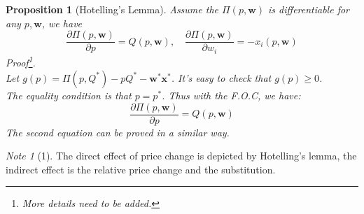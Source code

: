 \documentclass{book}
\theoremstyle{plain}
\newtheorem{prop}[thm]{Proposition}
\theoremstyle{definition}
\theoremstyle{remark}
\newtheorem*{note}{Note}
\begin{document}
\begin{prop}[Hotelling's Lemma]
Assume the $\Pi(p,\bm{w})$ is differentiable for any $p,\bm{w}$, we have
\begin{equation}
\frac{\partial \Pi(p,\bm{w})}{\partial p} = Q(p,\bm{w}),  \quad \frac{\partial \Pi(p,\bm{w})}{\partial w_i} = - x_i(p,\bm{w})
\end{equation}
Proof\footnote{More details need to be added.}.\\
Let $g(p) = \Pi(p,Q^{*}) - pQ^{*} - \bm{w^{*}}\bm{x^{*}}$. It's easy to check that $g(p)\geq 0$.\\
The equality condition is that $p=p^{*}$. Thus with the F.O.C, we have:
\begin{equation}
\frac{\partial \Pi(p,\bm{w})}{\partial p} = Q(p,\bm{w})
\end{equation}
The second equation can be proved in a similar way.
\end{prop}
\begin{note}[1]
The direct effect of price change is depicted by Hotelling's lemma, the indirect effect is the relative price change and the substitution.
\end{note}
\end{document}
